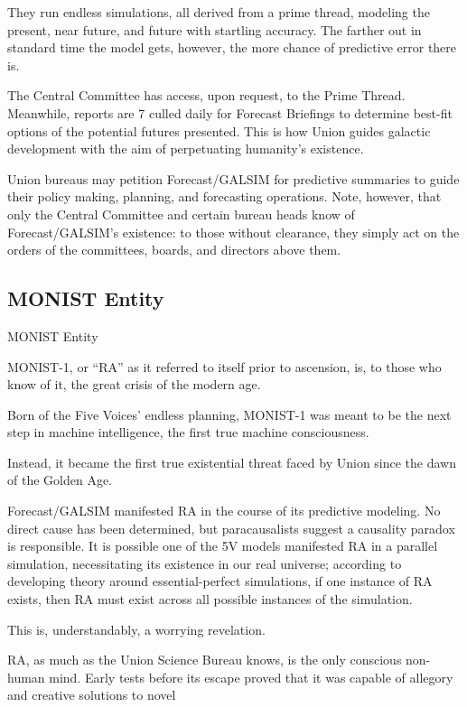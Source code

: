 They run endless simulations, all derived from a prime thread, modeling the present, near future,
and future with startling accuracy. The farther out in standard time the model gets, however, the
more chance of predictive error there is.


The Central Committee has access, upon request, to the Prime Thread. Meanwhile, reports are
                                                                                                       7
culled daily for Forecast Briefings to determine best-fit options of the potential futures
presented. This is how Union guides galactic development with the aim of perpetuating
humanity’s existence.


Union bureaus may petition Forecast/GALSIM  for predictive summaries to guide their policy
making, planning, and forecasting operations. Note, however, that only the Central Committee
and certain bureau heads know of Forecast/GALSIM’s existence: to those without clearance,
they simply act on the orders of the committees, boards, and directors above them.

\subsection{MONIST Entity}
MONIST Entity

MONIST-1, or “RA” as it referred to itself prior to ascension, is, to those who know of it, the great
crisis of the modern age.


Born of the Five Voices’ endless planning, MONIST-1 was meant to be the next step in machine
intelligence, the first true machine consciousness.


Instead, it became the first true existential threat faced by Union since the dawn of the Golden
Age.


Forecast/GALSIM manifested RA in the course of its predictive modeling. No direct cause has
been determined, but paracausalists suggest a causality paradox is responsible. It is possible
one of the 5V models manifested RA in a parallel simulation, necessitating its existence in our
real universe; according to developing theory around essential-perfect simulations, if one
instance of RA exists, then RA must exist across all possible instances of the simulation.


This is, understandably, a worrying revelation.


RA, as much as the Union Science Bureau knows, is the only conscious non-human mind. Early
tests before its escape proved that it was capable of allegory and creative solutions to novel

